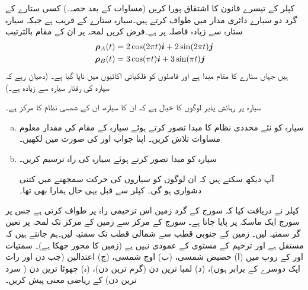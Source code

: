 کپلر کے تیسرے قانون  کا اشتقاق  پورا کریں (مساوات  کے بعد  حصہ۔)
کسی ستارے کے گرد دو سیارے دائری مدار میں  طواف  کرتے ہیں۔سیارہ  ستارے کے  قریب ہے جبکہ سیارہ ستارہ سے  زیادہ فاصلہ پر ہے۔فرض کریں لمحہ  پر ان کے مقام  بالترتیب 
\begin{align*}
{\ensuremath{{\boldsymbol{\rho}}}}_A(t)&=2\cos(2\pi t){\boldsymbol{i}}+2\sin(2\pi t){\boldsymbol{j}}\\
{{\boldsymbol{\rho}}}_B(t)&=3\cos(\pi t){\boldsymbol{i}}+3\sin(\pi t){\boldsymbol{j}}
\end{align*}
ہیں جہاں ستارے کا مقام مبدا ہے اور فاصلوں کو فلکیاتی اکائیوں میں ناپا گیا ہے۔ (دھیان رہے کہ سیارہ  کی رفتار سیارہ  سے زیادہ ہے۔)

سیارہ  پر رہائش پذیر  لوگوں کا خیال ہے کہ ان کا سیارہ، ان کے شمسی نظام کا مرکز ہے۔
\begin{enumerate}[a.]
\item
سیارہ  کو نئے محددی نظام کا  مبدا  تصور کرتے ہوئے سیارہ  کے مقام کی مقدار معلوم مساوات تلاش کریں۔ اپنا جواب  اور کی صورت میں لکھیں۔
\item
سیارہ  کو مبدا  تصور کرتے ہوئے  سیارہ  کی راہ ترسیم کریں۔

آپ دیکھ سکتے ہیں کہ ان لوگوں کو سیاروں کی حرکت سمجھنے میں کتنی دشواری ہو گی۔ کپلر سے قبل  یہی حال ہمارا  بھی تھا۔ 
\end{enumerate}
کپلر نے دریافت کیا  کہ سورج کے گرد زمین اس  ترخیمی راہ  پر  طواف کرتی ہے  جس پر سورج   ایک ماسکہ پر پایا جاتا ہے۔ سورج کے مرکز سے زمین کے مرکز تک لمحہ  پر تعین گر  سمتیہ  لیں۔ زمین کے جنوبی قطب  سے شمالی قطب تک سمتیہ  لیں۔ہم جانتے ہیں کہ  مستقل ہے اور ترخیم  کے مستوی  کے عمودی نہیں ہے (زمین کا محور  جھکا  ہے)۔ سمتیات  اور  کے روپ میں (ا)  حضیض شمسی، (ب) اوج شمسی، (ج)  اعتدالین  (جب دن اور رات ایک دوسرے کے برابر ہوں)، (د) لمبا ترین دن (گرم ترین دن)، (ہ) چھوٹا ترین دن ( سرد ترین دن) کے  ریاضی  معنی  پیش کریں۔
\\
\\
